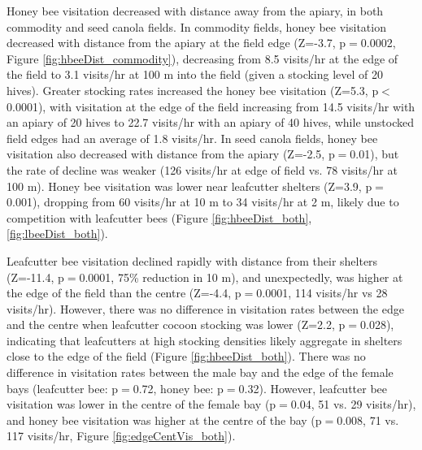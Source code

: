 \documentclass[12pt, draft]{article} %
\begin{document}
Honey bee visitation decreased with distance away from the apiary, in both commodity and seed canola fields.
In commodity fields, honey bee visitation decreased with distance from the apiary at the field edge (Z=-3.7, p$=$0.0002, Figure \ref{fig:hbeeDist_commodity}), decreasing from 8.5 visits/hr at the edge of the field to 3.1 visits/hr at 100 m into the field (given a stocking level of 20 hives).
Greater stocking rates increased the honey bee visitation (Z=5.3, p$<$0.0001), with visitation at the edge of the field increasing from 14.5 visits/hr with an apiary of 20 hives to 22.7 visits/hr with an apiary of 40 hives, while unstocked field edges had an average of 1.8 visits/hr.
In seed canola fields, honey bee visitation also decreased with distance from the apiary (Z=-2.5, p$=$0.01), but the rate of decline was weaker (126 visits/hr at edge of field vs. 78 visits/hr at 100 m). 
Honey bee visitation was lower near leafcutter shelters (Z=3.9, p$=$0.001), dropping from 60 visits/hr at 10 m to 34 visits/hr at 2 m, likely due to competition with leafcutter bees (Figure \ref{fig:hbeeDist_both}, \ref{fig:lbeeDist_both}).

Leafcutter bee visitation declined rapidly with distance from their shelters (Z=-11.4, p$=$0.0001, 75\% reduction in 10 m), and unexpectedly, was higher at the edge of the field than the centre (Z=-4.4, p$=$0.0001, 114 visits/hr vs 28 visits/hr). %
However, there was no difference in visitation rates between the edge and the centre when leafcutter cocoon stocking was lower (Z=2.2, p$=$0.028), indicating that leafcutters at high stocking densities likely aggregate in shelters close to the edge of the field (Figure \ref{fig:hbeeDist_both}).
There was no difference in visitation rates between the male bay and the edge of the female bays (leafcutter bee: p$=$0.72, honey bee: p$=$0.32). 
However, leafcutter bee visitation was lower in the centre of the female bay (p$=$0.04, 51 vs. 29 visits/hr), and honey bee visitation was higher at the centre of the bay (p$=$0.008, 71 vs. 117 visits/hr, Figure \ref{fig:edgeCentVis_both}).
\end{document}
